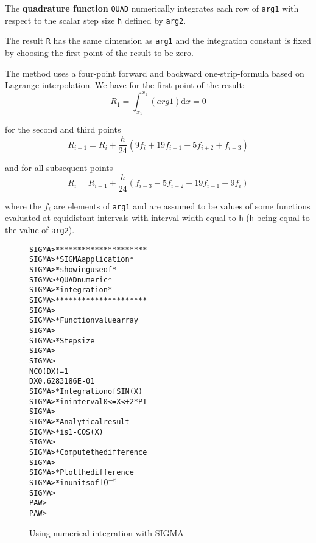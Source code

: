 
The {\bf quadrature function} \texttt{QUAD} numerically integrates each row of
\texttt{arg1} with respect to the scalar step size \texttt{h} defined by \texttt{arg2}.
 
The result \texttt{R} has the same dimension as \texttt{arg1} 
and the integration constant is
fixed by choosing the first point of the result to be zero.
 
The method uses a four-point forward and backward one-strip-formula based
on Lagrange interpolation. We have for the first point of the result:
\[
R_1 = \int_{ x_1 }^{ x_1 } ( arg1 ) \mathrm{d}x = 0
\]
 
for the second and third points
\[
R_{i+1} = R_i + \frac{h}{24} ( 9 f_i + 19 f_{i+1} - 5 f_{i+2} + f_{i+3} )
\]
 
and for all subsequent points
\[
R_i = R_{i-1} + \frac{h}{24} ( f_{i-3} - 5 f_{i-2} + 19 f_{i-1} + 9 f_i )
\]
 
where the \( f_i \) are elements of \texttt{arg1} and are assumed to be values of
some functions evaluated at equidistant intervals
with interval width equal to \texttt{h} (\texttt{h} being
equal to the value of \texttt{arg2}).

\begin{figure}
\begin{minipage}{.33\textwidth}
\begin{alltt}
SIGMA > *********************
SIGMA > * SIGMA application *
SIGMA > *  showing use of   *
SIGMA > *   QUAD numeric    *
SIGMA > *   integration     *
SIGMA > *********************
SIGMA > 
SIGMA > * Function value array
SIGMA > 
SIGMA > * Step size
SIGMA > 
SIGMA > 
 NCO(DX      )=    1
 DX       0.6283186E-01
SIGMA > * Integration of SIN(X)
SIGMA > * in interval 0<=X<+2*PI
SIGMA > 
SIGMA > * Analytical result
SIGMA > * is   1-COS(X)
SIGMA > 
SIGMA > * Compute the difference
SIGMA > 
SIGMA > * Plot the difference
SIGMA > *  in units of \(10\sp{-6}\)
SIGMA > 
PAW > 
PAW > 
\end{alltt}
\end{minipage}
\hfill
\begin{minipage}{.66\textwidth}
\begin{center}\mbox{}\end{center}
\end{minipage}

\caption{Using numerical integration with SIGMA}
\label{fig:SIGEXA1}
\end{figure}

